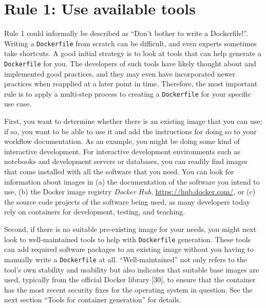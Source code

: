 \documentclass[10pt,letterpaper]{article}
\begin{document}
\normalsize

\hypertarget{rule-1-use-available-tools}{%
\section*{Rule 1: Use available
tools}\label{rule-1-use-available-tools}}

  \label{rule:tools} 

Rule 1 could informally be described as ``Don't bother to write a
Dockerfile!''. Writing a \texttt{Dockerfile} from scratch can be
difficult, and even experts sometimes take shortcuts. A good initial
strategy is to look at tools that can help generate a
\texttt{Dockerfile} for you. The developers of such tools have likely
thought about and implemented good practices, and they may even have
incorporated newer practices when reapplied at a later point in time.
Therefore, the most important rule is to apply a multi-step process to
creating a \texttt{Dockerfile} for your specific use case.

First, you want to determine whether there is an existing image that you
can use; if so, you want to be able to use it and add the instructions
for doing so to your workflow documentation. As an example, you might be
doing some kind of interactive development. For interactive development
environments such as notebooks and development servers or databases, you
can readily find images that come installed with all the software that
you need. You can look for information about images in (a) the
documentation of the software you intend to use, (b) the Docker image
registry \emph{Docker Hub}, \url{https://hub.docker.com/}, or (c) the
source code projects of the software being used, as many developers
today rely on containers for development, testing, and teaching.

Second, if there is no suitable pre-existing image for your needs, you
might next look to well-maintained tools to help with
\texttt{Dockerfile} generation. These tools can add required software
packages to an existing image without you having to manually write a
\texttt{Dockerfile} at all. ``Well-maintained'' not only refers to the
tool's own stability and usability but also indicates that suitable base
images are used, typically from the official Docker library {[}30{]}, to
ensure that the container has the most recent security fixes for the
operating system in question. See the next section ``Tools for container
generation'' for details.
\end{document}
